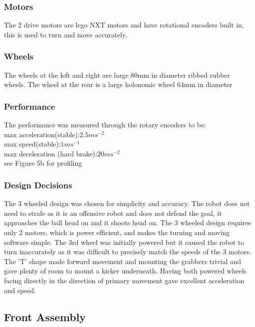 \subsubsection{Motors}
The 2 drive motors are lego NXT motors and have rotational encoders built in, this is used to turn and move accurately. 
\subsubsection{Wheels}
The wheels at the left and right are large 80mm in diameter ribbed rubber wheels. The wheel at the rear is a large holonomic wheel 64mm in diameter
\subsubsection{Performance}
The performance was measured through the rotary encoders to be:\\
max acceleration(stable):$2.5ms^{-2}$\\
max speed(stable):$1ms^{-1}$ \\
max deceleration (hard brake):$20ms^{-2}$\\
see Figure 5b for profiling\\


\subsubsection{Design Decisions}
The 3 wheeled design was chosen for simplicity and accuracy. The robot does not need to strafe as it is an offensive robot and does not defend the goal, it approaches the ball head on and it shoots head on. The 3 wheeled design requires only 2 motors, which is power efficient, and makes the turning and moving software simple. The 3rd wheel was initially powered but it caused the robot to turn inaccurately as it was difficult to precisely match the speeds of the 3 motors. The 'T' shape made forward movement and mounting the grabbers trivial and gave plenty of room to mount a kicker underneath. Having both powered wheels facing directly in the direction of primary movement gave excellent acceleration and speed.


\subsection{Front Assembly}
